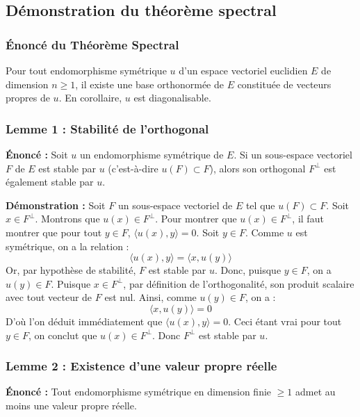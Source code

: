 \documentclass[11pt,a4paper]{article}
\begin{document}
\subsection{Démonstration du théorème spectral}

\subsubsection{Énoncé du Théorème Spectral}

Pour tout endomorphisme symétrique $u$ d'un espace vectoriel euclidien $E$ de dimension $n \ge 1$, il existe une base orthonormée de $E$ constituée de vecteurs propres de $u$. En corollaire, $u$ est diagonalisable.

\subsubsection{Lemme 1 : Stabilité de l'orthogonal}

\textbf{Énoncé :} Soit $u$ un endomorphisme symétrique de $E$. Si un sous-espace vectoriel $F$ de $E$ est stable par $u$ (c'est-à-dire $u(F) \subset F$), alors son orthogonal $F^\perp$ est également stable par $u$.

\textbf{Démonstration :}
Soit $F$ un sous-espace vectoriel de $E$ tel que $u(F) \subset F$.
Soit $x \in F^\perp$. Montrons que $u(x) \in F^\perp$.
Pour montrer que $u(x) \in F^\perp$, il faut montrer que pour tout $y \in F$, $\langle u(x), y \rangle = 0$.
Soit $y \in F$. Comme $u$ est symétrique, on a la relation :
$$\langle u(x), y \rangle = \langle x, u(y) \rangle$$
Or, par hypothèse de stabilité, $F$ est stable par $u$. Donc, puisque $y \in F$, on a $u(y) \in F$.
Puisque $x \in F^\perp$, par définition de l'orthogonalité, son produit scalaire avec tout vecteur de $F$ est nul. Ainsi, comme $u(y) \in F$, on a :
$$\langle x, u(y) \rangle = 0$$
D'où l'on déduit immédiatement que $\langle u(x), y \rangle = 0$.
Ceci étant vrai pour tout $y \in F$, on conclut que $u(x) \in F^\perp$.
Donc $F^\perp$ est stable par $u$.

\subsubsection{Lemme 2 : Existence d'une valeur propre réelle}

\textbf{Énoncé :} Tout endomorphisme symétrique en dimension finie $\ge 1$ admet au moins une valeur propre réelle.
\end{document}

